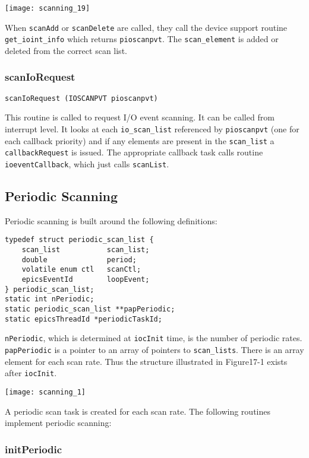 \texttt{[image: scanning\_19]}

When \verb|scanAdd| or \verb|scanDelete| are called, they call the device support routine \verb|get_ioint_info| which returns 
\verb|pioscanpvt|. The \verb|scan_element| is added or deleted from the correct scan list. 

\subsubsection{scanIoRequest}

\begin{verbatim}scanIoRequest (IOSCANPVT pioscanpvt)
\end{verbatim}This routine is called to request I/O event scanning. It can be called from interrupt level. It looks at each \verb|io_scan_list| 
referenced by \verb|pioscanpvt| (one for each callback priority) and if any elements are present in the \verb|scan_list| a 
\verb|callbackRequest| is issued. The appropriate callback task calls routine \verb|ioeventCallback|, which just calls 
\verb|scanList|. 

\subsection{Periodic Scanning}

Periodic scanning is built around the following definitions:

\begin{verbatim}typedef struct periodic_scan_list {
    scan_list           scan_list;
    double              period;
    volatile enum ctl   scanCtl;
    epicsEventId        loopEvent;
} periodic_scan_list;
static int nPeriodic;
static periodic_scan_list **papPeriodic;
static epicsThreadId *periodicTaskId;
\end{verbatim}\verb|nPeriodic|, which is determined at \verb|iocInit| time, is the number of periodic rates. \verb|papPeriodic| is a pointer to an 
array of pointers to \verb|scan_lists|. There is an array element for each scan rate. Thus the structure illustrated in 
Figure17-1 exists after \verb|iocInit|.

\texttt{[image: scanning\_1]}

A periodic scan task is created for each scan rate. The following routines implement periodic scanning:

\subsubsection{initPeriodic}

